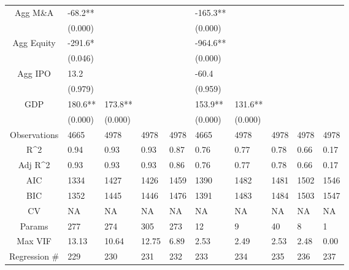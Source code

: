 \documentclass{article}
\begin{document}
\begin{table}[H]
\begin{tabular}{|clllllllll|}
  Agg M\&A & -68.2** &  &  &  & -165.3** &  &  &  &  \\
   & (0.000) &  &  &  & (0.000) &  &  &  &  \\
  Agg Equity & -291.6* &  &  &  & -964.6** &  &  &  &  \\
   & (0.046) &  &  &  & (0.000) &  &  &  &  \\
  Agg IPO & 13.2 &  &  &  & -60.4 &  &  &  &  \\
   & (0.979) &  &  &  & (0.959) &  &  &  &  \\
  GDP & 180.6** & 173.8** &  &  & 153.9** & 131.6** &  &  &  \\
   & (0.000) & (0.000) &  &  & (0.000) & (0.000) &  &  &  \\
  \hline
 Observations & 4665 & 4978 & 4978 & 4978 & 4665 & 4978 & 4978 & 4978 & 4978 \\
  R^2 & 0.94 & 0.93 & 0.93 & 0.87 & 0.76 & 0.77 & 0.78 & 0.66 & 0.17 \\
  Adj R^2 & 0.93 & 0.93 & 0.93 & 0.86 & 0.76 & 0.77 & 0.78 & 0.66 & 0.17 \\
  AIC & 1334 & 1427 & 1426 & 1459 & 1390 & 1482 & 1481 & 1502 & 1546 \\
  BIC & 1352 & 1445 & 1446 & 1476 & 1391 & 1483 & 1484 & 1503 & 1547 \\
  CV & NA & NA & NA & NA & NA & NA & NA & NA & NA \\
  Params & 277 & 274 & 305 & 273 & 12 & 9 & 40 & 8 & 1 \\
  Max VIF & 13.13 & 10.64 & 12.75 & 6.89 & 2.53 & 2.49 & 2.53 & 2.48 & 0.00 \\
  Regression \# & 229 & 230 & 231 & 232 & 233 & 234 & 235 & 236 & 237 \\
   \hline
\end{tabular}

\end{table}
\end{document}
